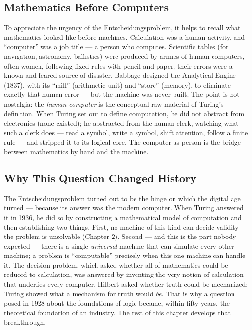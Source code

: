 \subsection{Mathematics Before Computers}
\label{sec:computation:math_before_computers}

To appreciate the urgency of the Entscheidungsproblem, it helps to recall what mathematics looked like before machines. Calculation was a human activity, and ``computer'' was a job title --- a person who computes. Scientific tables (for navigation, astronomy, ballistics) were produced by armies of human computers, often women, following fixed rules with pencil and paper; their errors were a known and feared source of disaster. Babbage designed the Analytical Engine (1837), with its ``mill'' (arithmetic unit) and ``store'' (memory), to eliminate exactly that human error --- but the machine was never built. The point is not nostalgia: the \emph{human computer} is the conceptual raw material of Turing's definition. When Turing set out to define computation, he did not abstract from electronics (none existed); he abstracted from the human clerk, watching what such a clerk does --- read a symbol, write a symbol, shift attention, follow a finite rule --- and stripped it to its logical core. The computer-as-person is the bridge between mathematics by hand and the machine.

\subsection{Why This Question Changed History}
\label{sec:computation:why_changed_history}

The Entscheidungsproblem turned out to be the hinge on which the digital age turned --- because its answer was the modern computer. When Turing answered it in 1936, he did so by constructing a mathematical model of computation and then establishing two things. First, no machine of this kind can decide validity --- the problem is unsolvable (Chapter 2). Second --- and this is the part nobody expected --- there is a single \emph{universal} machine that can simulate every other machine; a problem is ``computable'' precisely when this one machine can handle it. The decision problem, which asked whether all of mathematics could be reduced to calculation, was answered by inventing the very notion of calculation that underlies every computer. Hilbert asked whether truth could be mechanized; Turing showed what a mechanism for truth would \emph{be}. That is why a question posed in 1928 about the foundations of logic became, within fifty years, the theoretical foundation of an industry. The rest of this chapter develops that breakthrough.

